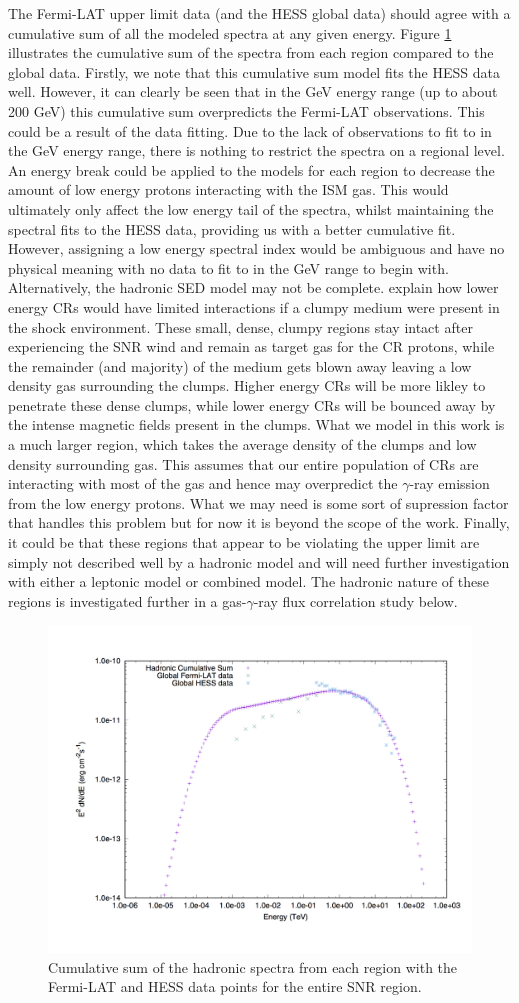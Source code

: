 \documentclass[12pt,a4paper]{article}
\begin{document}
The Fermi-LAT upper limit data (and the HESS global data) should agree with a cumulative sum of all the modeled spectra at any given energy. Figure \ref{fig:hadcumsum} illustrates the cumulative sum of the spectra from each region compared to the global data. Firstly, we note that this cumulative sum model fits the HESS data well. However, it can clearly be seen that in the GeV energy range (up to about 200 GeV) this cumulative sum overpredicts the Fermi-LAT observations. This could be a result of the data fitting. Due to the lack of observations to fit to in the GeV energy range, there is nothing to restrict the spectra on a regional level. An energy break could be applied to the models for each region to decrease the amount of low energy protons interacting with the ISM gas. This would ultimately only affect the low energy tail of the spectra, whilst maintaining the spectral fits to the HESS data, providing us with a better cumulative fit. However, assigning a low energy spectral index would be ambiguous and have no physical meaning with no data to fit to in the GeV range to begin with. Alternatively, the hadronic SED model may not be complete. \cite{2014MNRAS.445L..70G} explain how lower energy CRs would have limited interactions if a clumpy medium were present in the shock environment. These small, dense, clumpy regions stay intact after experiencing the SNR wind and remain as target gas for the CR protons, while the remainder (and majority) of the medium gets blown away leaving a low density gas surrounding the clumps. Higher energy CRs will be more likley to penetrate these dense clumps, while lower energy CRs will be bounced away by the intense magnetic fields present in the clumps. What we model in this work is a much larger region, which takes the average density of the clumps and low density surrounding gas. This assumes that our entire population of CRs are interacting with most of the gas and hence may overpredict the $\gamma$-ray emission from the low energy protons. What we may need is some sort of supression factor that handles this problem but for now it is beyond the scope of the work. Finally, it could be that these regions that appear to be violating the upper limit are simply not described well by a hadronic model and will need further investigation with either a leptonic model or combined model. The hadronic nature of these regions is investigated further in a gas-$\gamma$-ray flux correlation study below. 

\begin{figure}[H]
	\centering
	\includegraphics[width=0.4\linewidth, height=0.3\textheight, angle=-90]{rxj1713_had_cumsum}
	\caption{Cumulative sum of the hadronic spectra from each region with the Fermi-LAT and HESS data points for the entire SNR region.}
	\label{fig:hadcumsum}
\end{figure}
\end{document}
